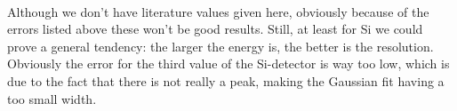   \label{tab:addlabel}%
\\
Although we don't have literature values given here, obviously because of the errors listed above these won't be good results. Still, at least for Si we could prove a general tendency: the larger the energy is, the better is the resolution. Obviously the error for the third value of the Si-detector is way too low, which is due to the fact that there is not really a peak, making the Gaussian fit having a too small width.





